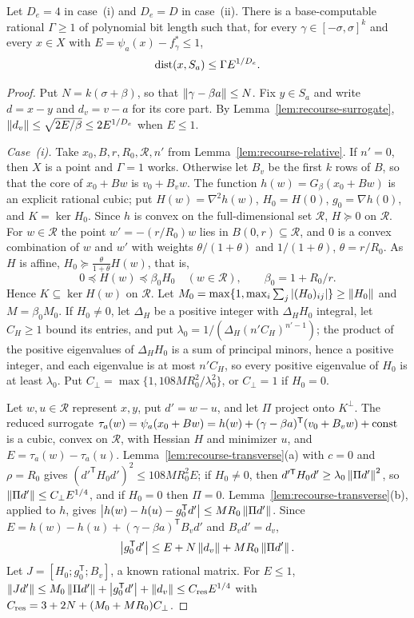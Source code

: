 \begin{lemma}
\label{lem:recourse-convexified-error}
Let $D_e=4$ in case~(i) and $D_e=D$ in case~(ii). There is a
base-computable rational $\Gamma\ge1$ of polynomial bit length such
that, for every $\gamma\in[-\sigma,\sigma]^k$ and every $x\in X$ with
$E=\psi_a(x)-f_\gamma^*\le1$,
\[
 \operatorname{dist}(x,S_a)\le\Gamma E^{1/D_e}.
\]
\end{lemma}

\begin{proof}
Put $N=k(\sigma+\beta)$, so that $\left\lVert\gamma-\beta a\right\rVert\le N$. Fix
$y\in S_a$ and write $d=x-y$ and $d_v=v-a$ for its core part. By
Lemma~\ref{lem:recourse-surrogate}, $\left\lVert d_v\right\rVert\le\sqrt{2E/\beta}\le
2E^{1/D_e}$ when $E\le1$.

\emph{Case~(i).} Take $x_0,B,r,R_0,\mathcal R,n'$ from
Lemma~\ref{lem:recourse-relative}. If $n'=0$, then $X$ is a point and
$\Gamma=1$ works. Otherwise let $B_v$ be the first $k$ rows of $B$, so
that the core of $x_0+Bw$ is $v_0+B_vw$. The function
$h(w)=G_\beta(x_0+Bw)$ is an explicit rational cubic; put
$H(w)=\nabla^2h(w)$, $H_0=H(0)$, $g_0=\nabla h(0)$, and $K=\ker H_0$. Since
$h$ is convex on the full-dimensional set $\mathcal R$, $H\succeq0$ on
$\mathcal R$. For $w\in\mathcal R$ the point $w'=-(r/R_0)w$ lies in
$B(0,r)\subseteq\mathcal R$, and $0$ is a convex combination of $w$ and
$w'$ with weights $\theta/(1+\theta)$ and $1/(1+\theta)$, $\theta=r/R_0$.
As $H$ is affine, $H_0\succeq\frac\theta{1+\theta}H(w)$, that is,
\[
 0\preceq H(w)\preceq\beta_0H_0\quad(w\in\mathcal R),\qquad
 \beta_0=1+R_0/r .
\]
Hence $K\subseteq\ker H(w)$ on $\mathcal R$. Let
$M_0=\max\{1,\max_i\sum_j\left\lvert(H_0)_{ij}\right\rvert\}\ge\left\lVert H_0\right\rVert$ and
$M=\beta_0M_0$. If $H_0\ne0$, let $\Delta_H$ be a positive integer with
$\Delta_HH_0$ integral, let $C_H\ge1$ bound its entries, and put
$\lambda_0=1/(\Delta_H(n'C_H)^{n'-1})$; the product of the positive
eigenvalues of $\Delta_HH_0$ is a sum of principal minors, hence a
positive integer, and each eigenvalue is at most $n'C_H$, so every
positive eigenvalue of $H_0$ is at least $\lambda_0$. Put
$C_\perp=\max\{1,108MR_0^2/\lambda_0^2\}$, or $C_\perp=1$ if $H_0=0$.

Let $w,u\in\mathcal R$ represent $x,y$, put $d'=w-u$, and let $\Pi$
project onto $K^\perp$. The reduced surrogate
$\tau_a(w)=\psi_a(x_0+Bw)=h(w)+(\gamma-\beta a)^{\mathsf T}(v_0+B_vw)+{\rm const}$
is a cubic, convex on $\mathcal R$, with Hessian $H$ and minimizer $u$,
and $E=\tau_a(w)-\tau_a(u)$. Lemma~\ref{lem:recourse-transverse}(a) with
$c=0$ and $\rho=R_0$ gives $(d'^{\mathsf T}H_0d')^2\le108MR_0^2E$; if
$H_0\ne0$, then $d'^{\mathsf T}H_0d'\ge\lambda_0\left\lVert\Pi d'\right\rVert^2$, so
$\left\lVert\Pi d'\right\rVert\le C_\perp E^{1/4}$, and if $H_0=0$ then $\Pi=0$.
Lemma~\ref{lem:recourse-transverse}(b), applied to $h$, gives
$\left\lvert h(w)-h(u)-g_0^{\mathsf T}d'\right\rvert\le MR_0\left\lVert\Pi d'\right\rVert$. Since
$E=h(w)-h(u)+(\gamma-\beta a)^{\mathsf T}B_vd'$ and $B_vd'=d_v$,
\[
 \left\lvert g_0^{\mathsf T}d'\right\rvert\le E+N\left\lVert d_v\right\rVert+MR_0\left\lVert\Pi d'\right\rVert .
\]
Let $J=[H_0;g_0^{\mathsf T};B_v]$, a known rational matrix. For $E\le1$,
$\left\lVert Jd'\right\rVert\le M_0\left\lVert\Pi d'\right\rVert+\left\lvert g_0^{\mathsf T}d'\right\rvert+\left\lVert d_v\right\rVert\le
C_{\rm res}E^{1/4}$ with $C_{\rm res}=3+2N+(M_0+MR_0)C_\perp$.


\end{proof}
